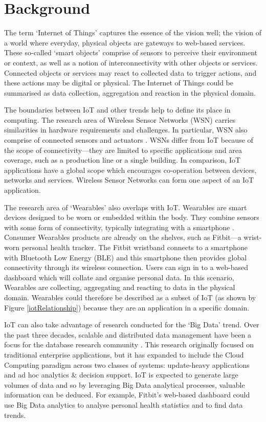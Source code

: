 \chapter{Background}
\label{Chapter:Background}
  The term `Internet of Things' captures the essence of the vision well; the vision of a world where everyday, physical objects are gateways to web-based services. These so-called `smart objects' comprise of sensors to perceive their environment or context, as well as a notion of interconnectivity with other objects or services. Connected objects or services may react to collected data to trigger actions, and these actions may be digital or physical. The Internet of Things could be summarised as data collection, aggregation and reaction in the physical domain.

  The boundaries between IoT and other trends help to define its place in computing. The research area of Wireless Sensor Networks (WSN) carries similarities in hardware requirements and challenges. In particular, WSN also comprise of connected sensors and actuators \citep{Mottola:2011}. WSNs differ from IoT because of the scope of connectivity---they are limited to specific applications and area coverage, such as a production line or a single building. In comparison, IoT applications have a global scope which encourages co-operation between devices, networks and services. Wireless Sensor Networks can form one aspect of an IoT application.

  The research area of `Wearables' also overlaps with IoT. Wearables are smart devices designed to be worn or embedded within the body. They combine sensors with some form of connectivity, typically integrating with a smartphone \citep{6844949}. Consumer Wearables products are already on the shelves, such as Fitbit---a wrist-worn personal health tracker. The Fitbit wristband connects to a smartphone with Bluetooth Low Energy (BLE) and this smartphone then provides global connectivity through its wireless connection. Users can sign in to a web-based dashboard which will collate and organise personal data. In this scenario, Wearables are collecting, aggregating and reacting to data in the physical domain. Wearables could therefore be described as a subset of IoT (as shown by Figure \ref{iotRelationship}) because they are an application in a specific domain.

  IoT can also take advantage of research conducted for the `Big Data' trend. Over the past three decades, scalable and distributed data management have been a focus for the database research community \citep{Agrawal}. This research originally focused on traditional enterprise applications, but it has expanded to include the Cloud Computing paradigm across two classes of systems: update-heavy applications and ad hoc analytics \& decision support. IoT is expected to generate large volumes of data and so by leveraging Big Data analytical processes, valuable information can be deduced. For example, Fitbit's web-based dashboard could use Big Data analytics to analyse personal health statistics and to find data trends. 

